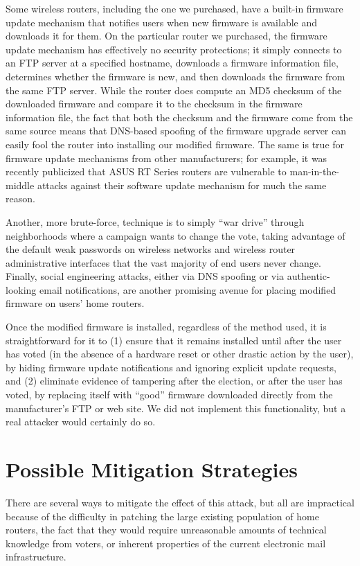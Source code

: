 \documentclass{article}
\begin{document}
Some wireless routers, including the one we purchased, have a built-in
firmware update mechanism that notifies users when new firmware is
available and downloads it for them. On the particular router we
purchased, the firmware update mechanism has effectively no security
protections; it simply connects to an FTP server at a specified
hostname, downloads a firmware information file, determines whether
the firmware is new, and then downloads the firmware from the same FTP
server. While the router does compute an MD5 checksum of the
downloaded firmware and compare it to the checksum in the firmware
information file, the fact that both the checksum and the firmware
come from the same source means that DNS-based spoofing of the
firmware upgrade server can easily fool the router into installing our
modified firmware. The same is true for firmware update mechanisms
from other manufacturers; for example, it was recently publicized that
ASUS RT Series routers are vulnerable to man-in-the-middle attacks
against their software update mechanism for much the same
reason.~\cite{AsusMITM}

Another, more brute-force, technique is to simply ``war drive''
through neighborhoods where a campaign wants to change the vote,
taking advantage of the default weak passwords on wireless networks
and wireless router administrative interfaces that the vast majority
of end users never change. Finally, social engineering attacks, either
via DNS spoofing or via authentic-looking email notifications, are
another promising avenue for placing modified firmware on users' home
routers.

Once the modified firmware is installed, regardless of the method
used, it is straightforward for it to (1) ensure that it remains
installed until after the user has voted (in the absence of a hardware
reset or other drastic action by the user), by hiding firmware update
notifications and ignoring explicit update requests, and (2) eliminate
evidence of tampering after the election, or after the user has voted,
by replacing itself with ``good'' firmware downloaded directly from
the manufacturer's FTP or web site. We did not implement this
functionality, but a real attacker would certainly do so.

\section{Possible Mitigation Strategies}

There are several ways to mitigate the effect of this attack, but all
are impractical because of the difficulty in patching the large
existing population of home routers, the fact that they would require
unreasonable amounts of technical knowledge from voters, or inherent
properties of the current electronic mail infrastructure.
\end{document}
